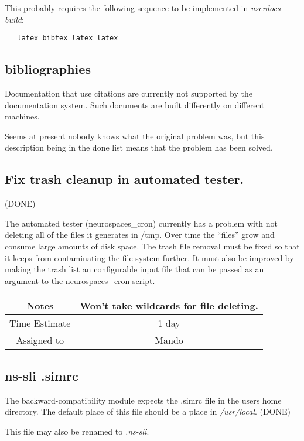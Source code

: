 \documentclass[12pt]{article}
\begin{document}
This probably requires the following sequence to be implemented in {\it userdocs-build}:
\begin{verbatim}
   latex bibtex latex latex
\end{verbatim}


\subsection{bibliographies}

Documentation that use citations are currently not supported by the
documentation system.  Such documents are built differently on
different machines.

Seems at present nobody knows what the original problem was, but this
description being in the done list means that the problem has been
solved.


\subsection{Fix trash cleanup in automated tester.} (DONE)

The automated tester (neurospaces\_cron) currently has a problem with
not deleting all of the files it generates in /tmp. Over time the
``files'' grow and consume large amounts of disk space. The trash file
removal must be fixed so that it keeps from contaminating the file
system further. It must also be improved by making the trash list an
configurable input file that can be passed as an argument to the
neurospaces\_cron script.

{
  \vspace{5mm}
  \centering
  \begin{tabular}{|c|c|}
    \hline
    Notes
    & Won't take wildcards for file deleting. \\
    \hline
    Time Estimate
    & 1 day \\
    \hline
    Assigned to
    & Mando \\
    \hline
  \end{tabular}
}


\subsection{ns-sli .simrc}

The backward-compatibility module expects the .simrc file in the users
home directory.  The default place of this file should be a place in
{\it /usr/local}. (DONE)

This file may also be renamed to {\it .ns-sli}.
\end{document}
